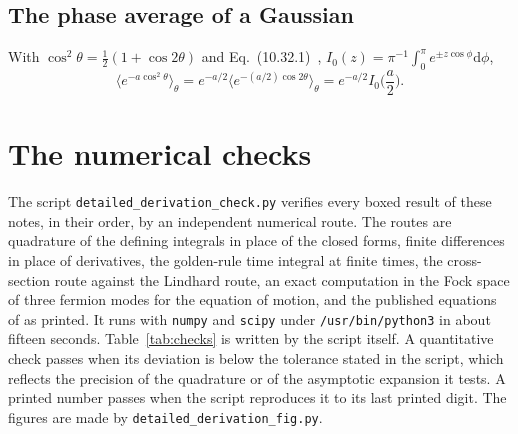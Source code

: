 \documentclass[11pt]{article}
\numberwithin{equation}{section}
\newcommand{\dd}{\mathrm d}
\begin{document}
\subsection{The phase average of a Gaussian}
With $\cos^2\theta=\tfrac12(1+\cos2\theta)$ and Eq.~(10.32.1)~\cite{DLMF},
$I_0(z)=\pi^{-1}\int_0^\pi e^{\pm z\cos\phi}\dd\phi$,
\begin{equation}
\big\langle e^{-a\cos^2\theta}\big\rangle_\theta=e^{-a/2}\big\langle e^{-(a/2)\cos2\theta}\big\rangle_\theta
=e^{-a/2}I_0\Big(\frac a2\Big).
\end{equation}


\section{The numerical checks}
\label{app:checks}
The script \texttt{detailed\_derivation\_check.py} verifies every boxed
result of these notes, in their order, by an independent numerical route.
The routes are quadrature of the defining integrals in place of the closed
forms, finite differences in place of derivatives, the golden-rule time
integral at finite times, the cross-section route against the Lindhard route,
an exact computation in the Fock space of three fermion modes for the
equation of motion, and the published equations of
\cite{BunkinFedorov1966,Silin1965,Atzeni2004} as printed. It runs
with \texttt{numpy} and \texttt{scipy} under \texttt{/usr/bin/python3} in about
fifteen seconds. Table~\ref{tab:checks} is written by the script itself. A
quantitative check passes when its deviation is below the tolerance stated in
the script, which reflects the precision of the quadrature or of the
asymptotic expansion it tests. A printed number passes when the script
reproduces it to its last printed digit. The figures are made by
\texttt{detailed\_derivation\_fig.py}.


\end{document}
